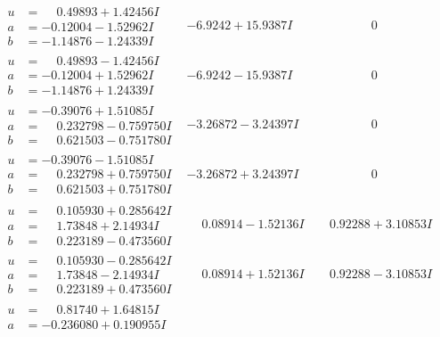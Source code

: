 \documentclass[1p]{elsarticle_modified}
\theoremstyle{definition}
\begin{document}
$$\begin{array}{c|c|c}
 \hline 
\begin{aligned}
u &= \phantom{-}0.49893 + 1.42456 I \\
a &= -0.12004 - 1.52962 I \\
b &= -1.14876 - 1.24339 I\end{aligned}
 & -6.9242 + 15.9387 I & \phantom{-0.000000 } 0 \\ \hline\begin{aligned}
u &= \phantom{-}0.49893 - 1.42456 I \\
a &= -0.12004 + 1.52962 I \\
b &= -1.14876 + 1.24339 I\end{aligned}
 & -6.9242 - 15.9387 I & \phantom{-0.000000 } 0 \\ \hline\begin{aligned}
u &= -0.39076 + 1.51085 I \\
a &= \phantom{-}0.232798 - 0.759750 I \\
b &= \phantom{-}0.621503 - 0.751780 I\end{aligned}
 & -3.26872 - 3.24397 I & \phantom{-0.000000 } 0 \\ \hline\begin{aligned}
u &= -0.39076 - 1.51085 I \\
a &= \phantom{-}0.232798 + 0.759750 I \\
b &= \phantom{-}0.621503 + 0.751780 I\end{aligned}
 & -3.26872 + 3.24397 I & \phantom{-0.000000 } 0 \\ \hline\begin{aligned}
u &= \phantom{-}0.105930 + 0.285642 I \\
a &= \phantom{-}1.73848 + 2.14934 I \\
b &= \phantom{-}0.223189 - 0.473560 I\end{aligned}
 & \phantom{-}0.08914 - 1.52136 I & \phantom{-}0.92288 + 3.10853 I \\ \hline\begin{aligned}
u &= \phantom{-}0.105930 - 0.285642 I \\
a &= \phantom{-}1.73848 - 2.14934 I \\
b &= \phantom{-}0.223189 + 0.473560 I\end{aligned}
 & \phantom{-}0.08914 + 1.52136 I & \phantom{-}0.92288 - 3.10853 I \\ \hline\begin{aligned}
u &= \phantom{-}0.81740 + 1.64815 I \\
a &= -0.236080 + 0.190955 I \\

\end{aligned}
\end{array}$$
\end{document}
